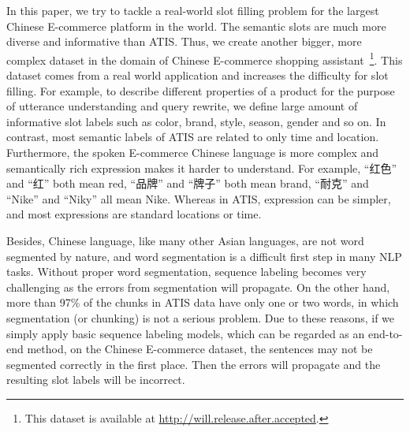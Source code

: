In this paper, we try to tackle a real-world slot filling problem 
for the largest Chinese E-commerce platform in the world.
The semantic  slots are much more diverse and informative than ATIS.
Thus, we create another bigger, more complex dataset
in the domain of Chinese E-commerce shopping 
assistant~\footnote{This dataset is available at \url{http://will.release.after.accepted}.}.
This dataset comes from a real world application 
and increases the difficulty for slot filling.
For example, to describe different properties of a product for 
the purpose of utterance understanding and query rewrite,
we define large amount of informative slot labels such as color, brand, 
style, season, gender and so on.
In contrast, most semantic labels of ATIS are related to only time and location.
Furthermore, the spoken E-commerce Chinese language is more complex 
and semantically rich expression makes it harder to understand.
For example, ``红色'' and ``红'' both mean red, ``品牌'' and ``牌子'' both mean brand, ``耐克'' and ``Nike'' and ``Niky'' all mean Nike.
Whereas in ATIS, expression can be simpler, and most expressions are 
standard locations or time.

Besides, Chinese language, like many other Asian languages, are not
word segmented by nature, and word segmentation is a difficult
first step in many NLP tasks.
Without proper word segmentation, sequence labeling becomes very challenging
as the errors from segmentation will propagate.
On the other hand, more than 97\% of the chunks in ATIS data 
have only one or two words,
in which segmentation (or chunking) is not a serious problem.
Due to these reasons,
if we simply apply basic sequence labeling models,
which can be regarded as an end-to-end method,
on the Chinese E-commerce dataset,
the sentences may not be segmented correctly in the first place.
Then the errors will propagate and the resulting slot labels will be incorrect.

